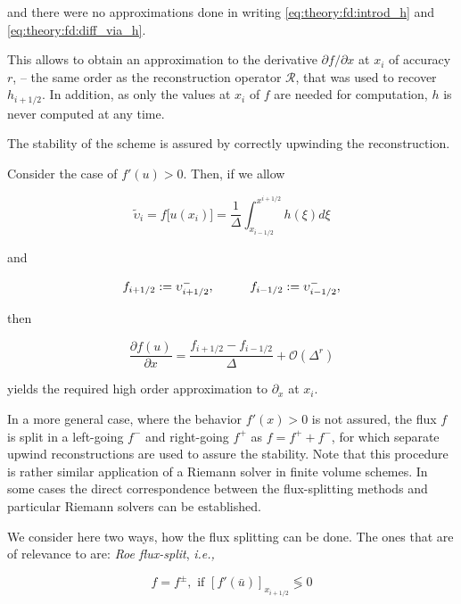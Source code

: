 and there were no approximations done in writing \ref{eq:theory:fd:introd_h} and \ref{eq:theory:fd:diff_via_h}.

This allows to obtain an approximation to the derivative $\partial f/\partial x$ at $x_i$ of accuracy $r$, -- the same order as the reconstruction operator $\mathcal{R}$, that was used to recover $h_{i+1/2}$. 
In addition, as only the values at $x_i$ of $f$ are needed for computation, $h$ is never computed at any time. 

The stability of the scheme is assured by correctly upwinding the reconstruction. 

Consider the case of $f'(u)>0$. Then, if we allow

\begin{equation}
\widetilde{\upsilon}_i = f\big[u(x_i)\big] = \frac{1}{\Delta}\int_{x_{i-1/2}}^{x^{i+1/2}}h(\xi)d \xi
\end{equation}

and 

\begin{equation}
f_{i+1/2} := \upsilon_{i+1/2} ^{-}, \hspace{10mm} f_{i-1/2} := \upsilon_{i-1/2} ^{-},
\end{equation}

then

\begin{equation}
\frac{\partial f(u)}{\partial x} = \frac{f_{i+1/2} - f_{i-1/2}}{\Delta} + \mathcal{O}(\Delta^r)
\end{equation}

yields the required high order approximation to $\partial_x$ at $x_i$. 

In a more general case, where the behavior $f'(x)>0$ is not assured, the flux $f$ is split in a left-going $f^{-}$ and right-going $f^{+}$ as $f = f^{+} + f^{-}$, for which separate upwind reconstructions are used to assure the stability. 
Note that this procedure is rather similar application of a Riemann solver in finite volume schemes. In some cases the direct correspondence between the flux-splitting methods and particular Riemann solvers can be established. 

We consider here two ways, how the flux splitting can be done. 
The ones that are of relevance to  are: \textit{Roe flux-split}, \textit{i.e.,}

\begin{equation}
f = f^{\pm}, \text{  if  } [f'(\bar{u})]_{x_{i+1/2}} \lessgtr 0
\label{eq:theory:fd:roefluxsplit}
\end{equation}

